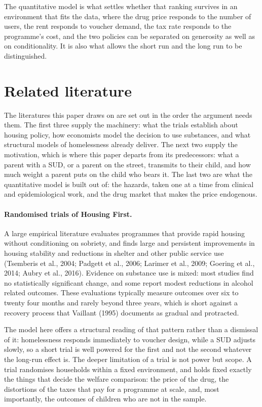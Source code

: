 \documentclass[10pt]{article}
\begin{document}
The quantitative model is what settles whether that ranking survives in an
environment that fits the data, where the drug price responds to the number of
users, the rent responds to voucher demand, the tax rate responds to the programme's
cost, and the two policies can be separated on generosity as well as on
conditionality. It is also what allows the short run and the long run to be
distinguished.



\section{Related literature}\label{sec:literature}

The literatures this paper draws on are set out in the order the
argument needs them. The first three supply the machinery: what the trials establish
about housing policy, how economists model the decision to use substances, and what structural
models of homelessness already deliver. The next two supply the motivation, which is
where this paper departs from its predecessors: what a parent with a SUD, or a
parent on the street, transmits to their child, and how much weight a parent puts on
the child who bears it. The last two are what the
quantitative model is built out of: the hazards, taken one at a time from clinical
and epidemiological work, and the drug market that makes the price endogenous.

\paragraph{Randomised trials of Housing First.} A large empirical literature
evaluates programmes that provide rapid housing without conditioning on sobriety,
and finds large and persistent improvements in housing stability and reductions in
shelter and other public service use (Tsemberis et al., 2004; Padgett et al., 2006; Larimer et al., 2009; Goering et al., 2014; Aubry et
al., 2016). Evidence on substance use is mixed: most studies find no statistically
significant change, and some report modest reductions in alcohol related outcomes.
These evaluations typically measure outcomes over six to twenty four months and
rarely beyond three years, which is short against a recovery process that Vaillant
(1995) documents as gradual and protracted.

The model here offers a structural
reading of that pattern rather than a dismissal of it: homelessness responds immediately
to voucher design, while a SUD adjusts slowly, so a short trial is well powered for
the first and not the second whatever the long-run effect is. The deeper
limitation of a trial is not power but scope. A trial randomises households within a fixed environment,
and holds fixed exactly the things that decide the welfare comparison: the price of
the drug, the distortions of the taxes that pay for a programme at scale, and, most
importantly, the outcomes of children who are not in the sample.
\end{document}
